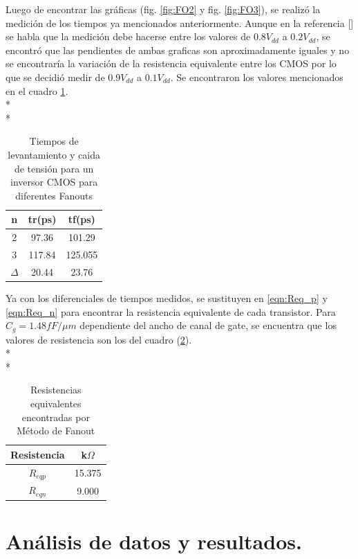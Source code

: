 \documentclass[12pt,a4paper]{article} %
\begin{document}
Luego de encontrar las gráficas (fig. \ref{fig:FO2} y fig. \ref{fig:FO3}), se realizó la medición de los tiempos ya mencionados anteriormente. Aunque en la referencia [] se habla que la medición debe hacerse entre los valores de $0.8V_{dd}$ a $0.2V_{dd}$, se encontró que las pendientes de ambas graficas son aproximadamente iguales y no se encontraría la variación de la resistencia equivalente entre los CMOS por lo que se decidió medir de $0.9V_{dd}$ a $0.1V_{dd}$. Se encontraron los valores mencionados en el cuadro \ref{table:tiempos}. \\*
\\*
\begin{table}\label{table:tiempos}
\begin{center}
\begin{tabular}{c||c||c}
n & tr(ps) & tf(ps)\\
\hline
\hline
2 & 97.36 & 101.29 \\
3 & 117.84 & 125.055 \\
$\Delta$ & 20.44 & 23.76\\
\hline
\end{tabular}
\caption{Tiempos de levantamiento y caida de tensión para un inversor CMOS para diferentes Fanouts}
\end{center}
\end{table}


Ya con los diferenciales de tiempos medidos, se sustituyen en \ref{eqn:Req_p} y \ref{eqn:Req_n} para encontrar la resistencia equivalente de cada transistor. Para $C_{g}=1.48 fF/\mu m$  dependiente del ancho de canal de gate, se encuentra que los valores de resistencia son los del cuadro (\ref{table:resistencias}). \\*
\\*
\begin{table}\label{table:resistencias}
\begin{center}
\begin{tabular}{c||c}
Resistencia & k$\Omega$\\
\hline
\hline
$R_{eqp}$ & 15.375 \\
$R_{eqn}$ & 9.000 \\
\hline
\end{tabular}
\caption{Resistencias equivalentes encontradas por Método de Fanout}
\end{center}
\end{table}




\section{Análisis de datos y resultados.}
\end{document}
